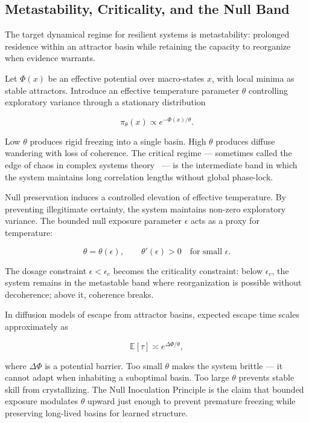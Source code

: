 \documentclass[11pt]{article}
\theoremstyle{remark}
\begin{document}
\subsection{Metastability, Criticality, and the Null Band}

The target dynamical regime for resilient systems is metastability: prolonged residence within an attractor basin while retaining the capacity to reorganize when evidence warrants.

Let $\Phi(x)$ be an effective potential over macro-states $x$, with local minima as stable attractors. Introduce an effective temperature parameter $\theta$ controlling exploratory variance through a stationary distribution

\[
\pi_\theta(x) \propto e^{-\Phi(x)/\theta}.
\]

Low $\theta$ produces rigid freezing into a single basin. High $\theta$ produces diffuse wandering with loss of coherence. The critical regime --- sometimes called the edge of chaos in complex systems theory~\cite{langton} --- is the intermediate band in which the system maintains long correlation lengths without global phase-lock.

Null preservation induces a controlled elevation of effective temperature. By preventing illegitimate certainty, the system maintains non-zero exploratory variance. The bounded null exposure parameter $\epsilon$ acts as a proxy for temperature:

\[
\theta = \theta(\epsilon), \qquad \theta'(\epsilon) > 0 \quad \text{for small } \epsilon.
\]

The dosage constraint $\epsilon < \epsilon_c$ becomes the criticality constraint: below $\epsilon_c$, the system remains in the metastable band where reorganization is possible without decoherence; above it, coherence breaks.

In diffusion models of escape from attractor basins, expected escape time scales approximately as

\begin{equation}
\mathbb{E}[\tau] \asymp e^{\Delta\Phi / \theta},
\label{eq:escape}
\end{equation}

where $\Delta\Phi$ is a potential barrier. Too small $\theta$ makes the system brittle --- it cannot adapt when inhabiting a suboptimal basin. Too large $\theta$ prevents stable skill from crystallizing. The Null Inoculation Principle is the claim that bounded exposure modulates $\theta$ upward just enough to prevent premature freezing while preserving long-lived basins for learned structure.
\end{document}
